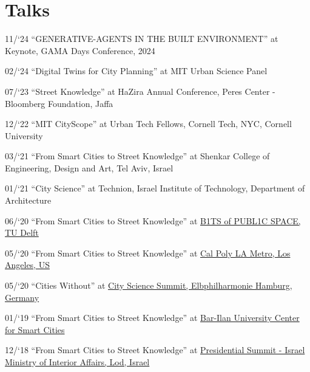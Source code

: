 \section*{Talks}

\begin{tablist}

    \item[11/`24] \tab \enquote{GENERATIVE-AGENTS IN THE BUILT ENVIRONMENT} at
    {Keynote, GAMA Days Conference, 2024}

    \item[02/`24] \tab \enquote{Digital Twins for City Planning} at
    {MIT Urban Science Panel}

    \item[07/`23] \tab \enquote{Street Knowledge} at
    {HaZira Annual Conference, Peres Center - Bloomberg Foundation, Jaffa}

    \item[12/`22] \tab \enquote{MIT CityScope} at
    {Urban Tech Fellows, Cornell Tech, NYC, Cornell University}

    \item[03/`21] \tab \enquote{From Smart Cities to Street Knowledge} at
    {Shenkar College of Engineering, Design and Art, Tel Aviv, Israel}

    \item[01/`21] \tab \enquote{City Science} at
    {Technion, Israel Institute of Technology, Department of Architecture}

    \item[06/`20] \tab \enquote{From Smart Cities to Street Knowledge} at
    \href{http://www.polistudelft.nl/urbanism-week/b1ts-of-publ1c-space-3-0/}{B1TS of PUBL1C SPACE, TU Delft}

    \item[05/`20] \tab \enquote{From Smart Cities to Street Knowledge} at
    \href{https://www.youtube.com/watch?v=Rh5ks9x3720}{Cal Poly LA Metro, Los Angeles, US}

    \item[05/`20] \tab \enquote{Cities Without} at
    \href{https://www.youtube.com/watch?v=PZg6A_A65lQ}{City Science Summit, Elbphilharmonie Hamburg, Germany}

    \item[01/`19] \tab \enquote{From Smart Cities to Street Knowledge} at
    \href{https://law.biu.ac.il/sites/law/files/shared/mrym_khkmvt_lkhkmt_hrkhvb.pdf}{
        Bar-Ilan University Center for Smart Cities}

    \item[12/`18] \tab \enquote{From Smart Cities to Street Knowledge} at
    \href{https://www.youtube.com/watch?v=skIEkM9-1yg}{Presidential Summit - Israel Ministry of Interior Affairs, Lod, Israel}


\end{tablist}
